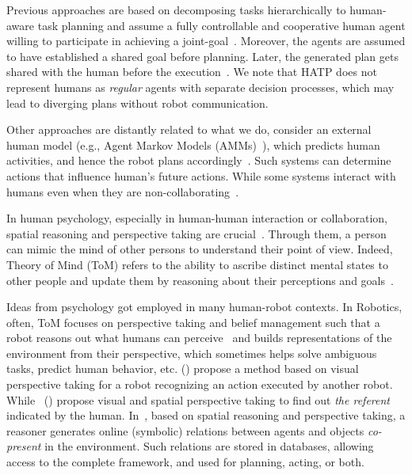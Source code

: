 \documentclass[letterpaper]{article} %
\begin{document}
Previous approaches are based on decomposing tasks hierarchically to human-aware task planning and assume a fully controllable and cooperative human agent willing to participate in achieving a joint-goal~\cite{alami2006toward,montreuil2007planning,alili2009planning,alili2009task,lallement2014hatp,de2015hatp,lallement2018hatp}. 
Moreover, the agents are assumed to have established a shared goal before planning. 
Later, the generated plan gets shared with the human before the execution~\cite{milliez2016using}.
We note that HATP does not represent humans as \textit{regular} agents with separate decision processes, which may lead to diverging plans without robot communication.

Other approaches are distantly related to what we do, consider an external human model (e.g., Agent Markov Models (AMMs)~\cite{unhelkar2020decision,UnhelkarLS19}), which predicts human activities, and hence the robot plans accordingly~\cite{hoffman2007effects,unhelkar2020decision,UnhelkarLS19}. Such systems can determine actions that influence human's future actions. While some systems interact with humans even when they are non-collaborating~\cite{buckingham2020robot}.

In human psychology, especially in human-human interaction or collaboration, spatial reasoning and perspective taking are crucial~\cite{flavell1992perspectives,tversky1999speakers}. Through them, a person can mimic the mind of other persons to understand their point of view. Indeed, Theory of Mind (ToM) refers to the ability to ascribe distinct mental states to other people and update them by reasoning about their perceptions and goals~\cite{premack1978does,baron1985does}.

Ideas from psychology got employed in many human-robot contexts. In Robotics, often, ToM focuses on perspective taking and belief management such that a robot reasons out what humans can perceive~\cite{berlin2006perspective,milliez2014framework} and builds representations of the environment from their perspective, which sometimes helps solve ambiguous tasks, predict human behavior, etc.
\citeauthor{johnson2005perceptual} (\citeyear{johnson2005perceptual}) propose a method based on visual perspective taking for a robot recognizing an action executed by another robot. 
While~\citeauthor{milliez2014framework} (\citeyear{milliez2014framework}) propose visual and spatial perspective taking to find out {\em the referent} indicated by the human. 
In~\cite{Sisbot2011SituationAF}, based on spatial reasoning and perspective taking, a reasoner generates online (symbolic) relations between agents and objects {\em co-present} in the environment. 
Such relations are stored in databases, allowing access to the complete framework, and used for planning, acting, or both.
\end{document}
